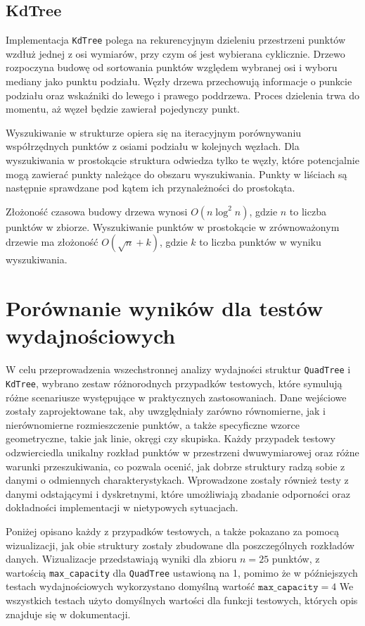 \documentclass[12pt]{article}
\begin{document}
\subsection{KdTree}
Implementacja \texttt{KdTree} polega na rekurencyjnym dzieleniu przestrzeni punktów wzdłuż jednej z osi wymiarów, przy czym oś jest wybierana cyklicznie. Drzewo rozpoczyna budowę od sortowania punktów względem wybranej osi i wyboru mediany jako punktu podziału. Węzły drzewa przechowują informacje o punkcie podziału oraz wskaźniki do lewego i prawego poddrzewa. Proces dzielenia trwa do momentu, aż węzeł będzie zawierał pojedynczy punkt.

\noindent Wyszukiwanie w strukturze opiera się na iteracyjnym porównywaniu współrzędnych punktów z osiami podziału w kolejnych węzłach. Dla wyszukiwania w prostokącie struktura odwiedza tylko te węzły, które potencjalnie mogą zawierać punkty należące do obszaru wyszukiwania. Punkty w liściach są następnie sprawdzane pod kątem ich przynależności do prostokąta.

\noindent Złożoność czasowa budowy drzewa wynosi \( O(n \log^2 n) \), gdzie \( n \) to liczba punktów w zbiorze. Wyszukiwanie punktów w prostokącie w zrównoważonym drzewie ma złożoność \( O(\sqrt{n} + k) \), gdzie \( k \) to liczba punktów w wyniku wyszukiwania.


\section{Porównanie wyników dla testów wydajnościowych}

W celu przeprowadzenia wszechstronnej analizy wydajności struktur \texttt{QuadTree} i \texttt{KdTree}, wybrano zestaw różnorodnych przypadków testowych, które symulują różne scenariusze występujące w praktycznych zastosowaniach. Dane wejściowe zostały zaprojektowane tak, aby uwzględniały zarówno równomierne, jak i nierównomierne rozmieszczenie punktów, a także specyficzne wzorce geometryczne, takie jak linie, okręgi czy skupiska. Każdy przypadek testowy odzwierciedla unikalny rozkład punktów w przestrzeni dwuwymiarowej oraz różne warunki przeszukiwania, co pozwala ocenić, jak dobrze struktury radzą sobie z danymi o odmiennych charakterystykach. Wprowadzone zostały również testy z danymi odstającymi i dyskretnymi, które umożliwiają zbadanie odporności oraz dokładności implementacji w nietypowych sytuacjach. 

\noindent Poniżej opisano każdy z przypadków testowych, a także pokazano za pomocą wizualizacji, jak obie struktury zostały zbudowane dla poszczególnych rozkładów danych. Wizualizacje przedstawiają wyniki dla zbioru \( n = 25 \) punktów, z wartością \texttt{max\_capacity} dla \texttt{QuadTree} ustawioną na 1, pomimo że w późniejszych testach wydajnościowych wykorzystano domyślną wartość \( \texttt{max\_capacity} = 4 \) We wszystkich testach użyto domyślnych wartości dla funkcji testowych, których opis znajduje się w dokumentacji.
\end{document}
